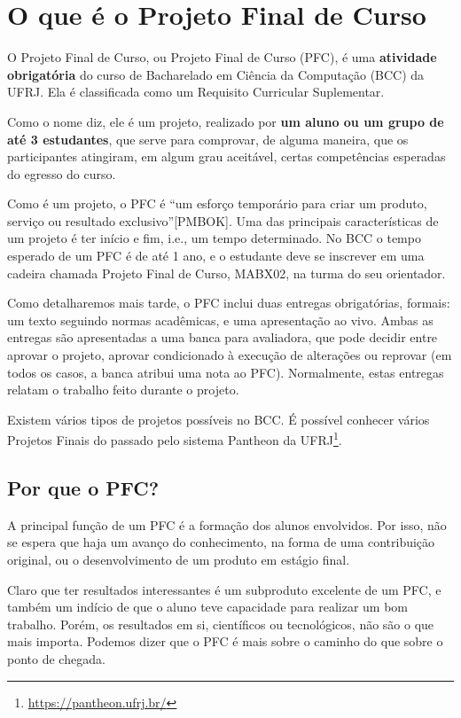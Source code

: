 \chapter{O que é o Projeto Final de Curso}

O Projeto Final de Curso, ou Projeto Final de Curso (PFC), é uma \textbf{atividade obrigatória} do curso de Bacharelado em Ciência da Computação (BCC) da UFRJ. Ela é classificada como um Requisito Curricular Suplementar.

Como o nome diz, ele é um projeto, realizado por \textbf{um aluno ou um grupo de até 3 estudantes}, que serve para comprovar, de alguma maneira, que os participantes atingiram, em algum grau aceitável, certas competências esperadas do egresso do curso.

Como é um projeto, o PFC é “um esforço temporário para criar um produto, serviço ou resultado exclusivo”[PMBOK]. Uma das principais características de um projeto é ter início e fim, i.e., um tempo determinado. No BCC o tempo esperado de um PFC é de até 1 ano, e o estudante deve se inscrever em uma cadeira chamada Projeto Final de Curso, MABX02, na turma do seu orientador.

Como detalharemos mais tarde, o PFC inclui duas entregas obrigatórias, formais: um texto seguindo normas acadêmicas, e uma apresentação ao vivo. Ambas as entregas são apresentadas a uma banca para avaliadora, que pode decidir entre aprovar o projeto, aprovar condicionado à execução de alterações ou reprovar (em todos os casos, a banca atribui uma nota ao PFC). Normalmente, estas entregas relatam o trabalho feito durante o projeto.

Existem vários tipos de projetos possíveis no BCC. É possível conhecer vários Projetos Finais do passado pelo sistema Pantheon da UFRJ\footnote{\url{https://pantheon.ufrj.br/}}.

\section{Por que o PFC?}

A principal função de um PFC é a formação dos alunos envolvidos. Por isso, não se espera que haja um avanço do conhecimento, na forma de uma contribuição original, ou o desenvolvimento de um produto em estágio final.

Claro que ter resultados interessantes é um subproduto excelente de um PFC, e também um indício de que o aluno teve capacidade para realizar um bom trabalho. Porém, os resultados em si, científicos ou tecnológicos, não são o que mais importa. Podemos dizer que o PFC é mais sobre o caminho do que sobre o ponto de chegada.

